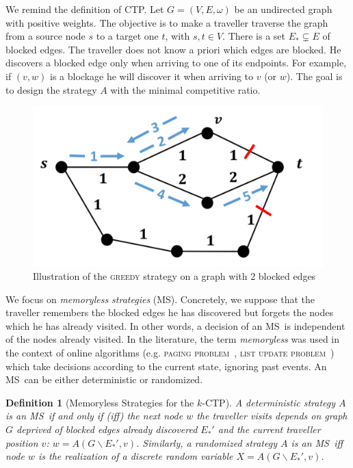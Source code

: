 \documentclass[11pt,letterpaper]{article}
\newtheorem{definition}{Definition}
\newcommand{\kctp}{$k$-CTP}
\newcommand{\stpath}{$(s,t)$-path}
\newcommand{\mts}{MS}
\begin{document}
We remind the definition of CTP. Let $G=\left(V,E,\omega\right)$ be an undirected graph with positive weights. The objective is to make a traveller traverse the graph from a source node $s$ to a target one $t$, with $s,t \in V$. There is a set $E_* \subsetneq E$ of blocked edges. %
The traveller does not know a priori which edges are blocked. He discovers a blocked edge only when arriving to one of its endpoints. For example, if $\left(v,w\right)$ is a blockage he will discover it when arriving to $v$ (or $w$). The goal is to design the strategy $A$ with the minimal competitive ratio.

\begin{figure}[t]
\centering
\includegraphics[scale=0.27]{graphics/illustrateCTP2.pdf}
\caption{Illustration of the \textsc{greedy} strategy on a graph with 2 blocked edges}
\label{fig:illustrateCTP}
\end{figure}

We focus on \textit{memoryless strategies} (\mts). Concretely, we suppose that the traveller remembers the blocked edges he has discovered but forgets the nodes which he has already visited. In other words, a decision of an \mts ~is independent of the nodes already visited. In the literature, the term \textit{memoryless} was used in the context of online algorithms (e.g. \textsc{paging problem}~\cite{BoEl98}, \textsc{list update problem}~\cite{Al03}) which take decisions according to the current state, ignoring past events. An \mts ~can be either deterministic or randomized.



\begin{definition}[Memoryless Strategies for the \kctp]
A deterministic strategy $A$ is an \mts ~if and only if (iff) the next node $w$ the traveller visits depends on graph $G$ deprived of blocked edges already discovered $E_*'$ and the current traveller position $v$: $w = A\left(G\backslash E_*',v\right)$. Similarly, a randomized strategy $A$ is an \mts ~iff node $w$ is the realization of a discrete random variable $X = A\left(G\backslash E_*',v\right)$.
\end{definition}
\end{document}
